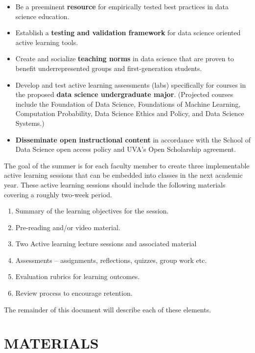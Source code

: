 \documentclass[
  letterpaper,
  DIV=11,
  numbers=noendperiod]{scrreprt}
\begin{document}
\begin{itemize}
\item
  Be a preeminent \textbf{resource} for empirically tested best
  practices in data science education.
\item
  Establish a \textbf{testing and validation framework} for data science
  oriented active learning tools.
\item
  Create and socialize \textbf{teaching norms} in data science that are
  proven to benefit underrepresented groups and first-generation
  students.
\item
  Develop and test active learning assessments (labs) specifically for
  courses in the proposed \textbf{data science undergraduate major}.
  (Projected courses include the Foundation of Data Science, Foundations
  of Machine Learning, Computation Probability, Data Science Ethics and
  Policy, and Data Science Systems.)
\item
  \textbf{Disseminate open instructional content} in accordance with the
  School of Data Science open access policy and UVA's Open Scholarship
  agreement.
\end{itemize}

The goal of the summer is for each faculty member to create three
implementable active learning sessions that can be embedded into classes
in the next academic year. These active learning sessions should include
the following materials covering a roughly two-week period.

\begin{enumerate}
\def\labelenumi{\Roman{enumi}.}
\item
  Summary of the learning objectives for the session.
\item
  Pre-reading and/or video material.
\item
  Two Active learning lecture sessions and associated material
\item
  Assessments -- assignments, reflections, quizzes, group work etc.
\item
  Evaluation rubrics for learning outcomes.
\item
  Review process to encourage retention.
\end{enumerate}

The remainder of this document will describe each of these elements.

\hypertarget{materials}{%
\section{MATERIALS}\label{materials}}
\end{document}
